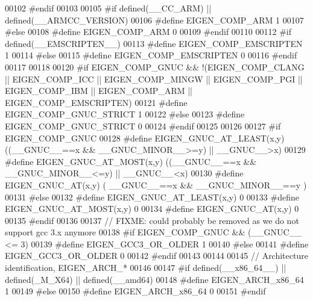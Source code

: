 \begin{DoxyCode}
00102 \textcolor{preprocessor}{#endif}
00103 
00105 \textcolor{preprocessor}{#if defined(\_\_CC\_ARM) || defined(\_\_ARMCC\_VERSION)}
00106 \textcolor{preprocessor}{  #define EIGEN\_COMP\_ARM 1}
00107 \textcolor{preprocessor}{#else}
00108 \textcolor{preprocessor}{  #define EIGEN\_COMP\_ARM 0}
00109 \textcolor{preprocessor}{#endif}
00110 
00112 \textcolor{preprocessor}{#if defined(\_\_EMSCRIPTEN\_\_)}
00113 \textcolor{preprocessor}{  #define EIGEN\_COMP\_EMSCRIPTEN 1}
00114 \textcolor{preprocessor}{#else}
00115 \textcolor{preprocessor}{  #define EIGEN\_COMP\_EMSCRIPTEN 0}
00116 \textcolor{preprocessor}{#endif}
00117 
00118 
00120 \textcolor{preprocessor}{#if EIGEN\_COMP\_GNUC && !(EIGEN\_COMP\_CLANG || EIGEN\_COMP\_ICC || EIGEN\_COMP\_MINGW || EIGEN\_COMP\_PGI ||
       EIGEN\_COMP\_IBM || EIGEN\_COMP\_ARM || EIGEN\_COMP\_EMSCRIPTEN)}
00121 \textcolor{preprocessor}{  #define EIGEN\_COMP\_GNUC\_STRICT 1}
00122 \textcolor{preprocessor}{#else}
00123 \textcolor{preprocessor}{  #define EIGEN\_COMP\_GNUC\_STRICT 0}
00124 \textcolor{preprocessor}{#endif}
00125 
00126 
00127 \textcolor{preprocessor}{#if EIGEN\_COMP\_GNUC}
00128 \textcolor{preprocessor}{  #define EIGEN\_GNUC\_AT\_LEAST(x,y) ((\_\_GNUC\_\_==x && \_\_GNUC\_MINOR\_\_>=y) || \_\_GNUC\_\_>x)}
00129 \textcolor{preprocessor}{  #define EIGEN\_GNUC\_AT\_MOST(x,y)  ((\_\_GNUC\_\_==x && \_\_GNUC\_MINOR\_\_<=y) || \_\_GNUC\_\_<x)}
00130 \textcolor{preprocessor}{  #define EIGEN\_GNUC\_AT(x,y)       ( \_\_GNUC\_\_==x && \_\_GNUC\_MINOR\_\_==y )}
00131 \textcolor{preprocessor}{#else}
00132 \textcolor{preprocessor}{  #define EIGEN\_GNUC\_AT\_LEAST(x,y) 0}
00133 \textcolor{preprocessor}{  #define EIGEN\_GNUC\_AT\_MOST(x,y)  0}
00134 \textcolor{preprocessor}{  #define EIGEN\_GNUC\_AT(x,y)       0}
00135 \textcolor{preprocessor}{#endif}
00136 
00137 \textcolor{comment}{// FIXME: could probably be removed as we do not support gcc 3.x anymore}
00138 \textcolor{preprocessor}{#if EIGEN\_COMP\_GNUC && (\_\_GNUC\_\_ <= 3)}
00139 \textcolor{preprocessor}{#define EIGEN\_GCC3\_OR\_OLDER 1}
00140 \textcolor{preprocessor}{#else}
00141 \textcolor{preprocessor}{#define EIGEN\_GCC3\_OR\_OLDER 0}
00142 \textcolor{preprocessor}{#endif}
00143 
00144 
00145 \textcolor{comment}{// Architecture identification, EIGEN\_ARCH\_*}
00146 
00147 \textcolor{preprocessor}{#if defined(\_\_x86\_64\_\_) || defined(\_M\_X64) || defined(\_\_amd64)}
00148 \textcolor{preprocessor}{  #define EIGEN\_ARCH\_x86\_64 1}
00149 \textcolor{preprocessor}{#else}
00150 \textcolor{preprocessor}{  #define EIGEN\_ARCH\_x86\_64 0}
00151 \textcolor{preprocessor}{#endif}

\end{DoxyCode}
